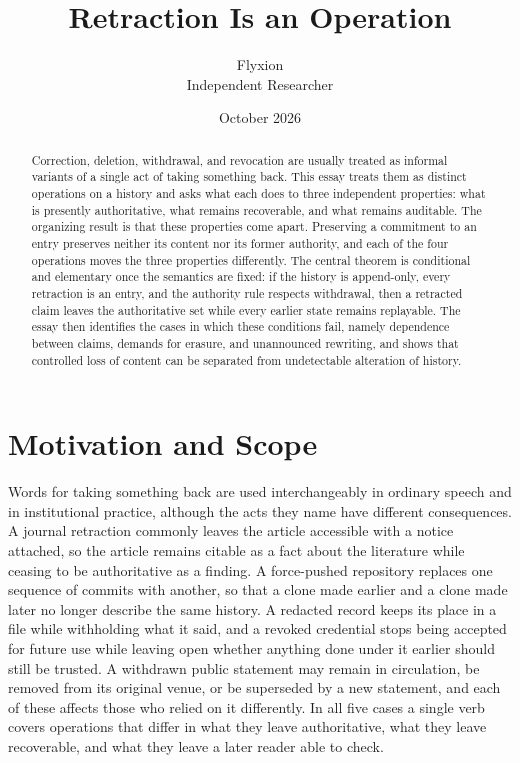 \documentclass[11pt]{article}
\title{Retraction Is an Operation}
\author{Flyxion\\Independent Researcher}
\date{October 2026}
\theoremstyle{plain}
\theoremstyle{definition}
\theoremstyle{remark}
\begin{document}
\maketitle

\begin{abstract}
Correction, deletion, withdrawal, and revocation are usually treated as informal variants of a single act of taking something back. This essay treats them as distinct operations on a history and asks what each does to three independent properties: what is presently authoritative, what remains recoverable, and what remains auditable. The organizing result is that these properties come apart. Preserving a commitment to an entry preserves neither its content nor its former authority, and each of the four operations moves the three properties differently. The central theorem is conditional and elementary once the semantics are fixed: if the history is append-only, every retraction is an entry, and the authority rule respects withdrawal, then a retracted claim leaves the authoritative set while every earlier state remains replayable. The essay then identifies the cases in which these conditions fail, namely dependence between claims, demands for erasure, and unannounced rewriting, and shows that controlled loss of content can be separated from undetectable alteration of history.
\end{abstract}

\section{Motivation and Scope}
Words for taking something back are used interchangeably in ordinary speech and in institutional practice, although the acts they name have different consequences. A journal retraction commonly leaves the article accessible with a notice attached, so the article remains citable as a fact about the literature while ceasing to be authoritative as a finding. A force-pushed repository replaces one sequence of commits with another, so that a clone made earlier and a clone made later no longer describe the same history. A redacted record keeps its place in a file while withholding what it said, and a revoked credential stops being accepted for future use while leaving open whether anything done under it earlier should still be trusted. A withdrawn public statement may remain in circulation, be removed from its original venue, or be superseded by a new statement, and each of these affects those who relied on it differently. In all five cases a single verb covers operations that differ in what they leave authoritative, what they leave recoverable, and what they leave a later reader able to check.
\end{document}
